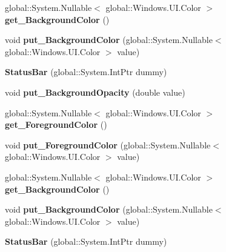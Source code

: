 \begin{DoxyCompactItemize}
global\+::\+System.\+Nullable$<$ global\+::\+Windows.\+U\+I.\+Color $>$ {\bfseries get\+\_\+\+Background\+Color} ()
\item 
\mbox{\label{class_windows_1_1_u_i_1_1_view_management_1_1_status_bar_a6ecff49f6682ca50e73617ccc3a605c7}} 
void {\bfseries put\+\_\+\+Background\+Color} (global\+::\+System.\+Nullable$<$ global\+::\+Windows.\+U\+I.\+Color $>$ value)
\item 
\mbox{\label{class_windows_1_1_u_i_1_1_view_management_1_1_status_bar_a65d3147572b09fbe272cd6647bfd1e34}} 
{\bfseries Status\+Bar} (global\+::\+System.\+Int\+Ptr dummy)
\item 
\mbox{\label{class_windows_1_1_u_i_1_1_view_management_1_1_status_bar_a6ab4fd00fb5d69e32bc38be43009139d}} 
void {\bfseries put\+\_\+\+Background\+Opacity} (double value)
\item 
\mbox{\label{class_windows_1_1_u_i_1_1_view_management_1_1_status_bar_a75d85c386b8ab944ec2aa2478a574562}} 
global\+::\+System.\+Nullable$<$ global\+::\+Windows.\+U\+I.\+Color $>$ {\bfseries get\+\_\+\+Foreground\+Color} ()
\item 
\mbox{\label{class_windows_1_1_u_i_1_1_view_management_1_1_status_bar_a870c24a2f4b4920a961161ce6662d40b}} 
void {\bfseries put\+\_\+\+Foreground\+Color} (global\+::\+System.\+Nullable$<$ global\+::\+Windows.\+U\+I.\+Color $>$ value)
\item 
\mbox{\label{class_windows_1_1_u_i_1_1_view_management_1_1_status_bar_a913df88438ec0972e82cf1b25b142912}} 
global\+::\+System.\+Nullable$<$ global\+::\+Windows.\+U\+I.\+Color $>$ {\bfseries get\+\_\+\+Background\+Color} ()
\item 
\mbox{\label{class_windows_1_1_u_i_1_1_view_management_1_1_status_bar_a6ecff49f6682ca50e73617ccc3a605c7}} 
void {\bfseries put\+\_\+\+Background\+Color} (global\+::\+System.\+Nullable$<$ global\+::\+Windows.\+U\+I.\+Color $>$ value)
\item 
\mbox{\label{class_windows_1_1_u_i_1_1_view_management_1_1_status_bar_a65d3147572b09fbe272cd6647bfd1e34}} 
{\bfseries Status\+Bar} (global\+::\+System.\+Int\+Ptr dummy)
\end{DoxyCompactItemize}
